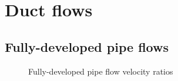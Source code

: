 %

\chapter{Duct flows}

\section{Fully-developed pipe flows}

\begin{figure}
    \centering
    
    \caption{Fully-developed pipe flow velocity ratios}
\end{figure}
